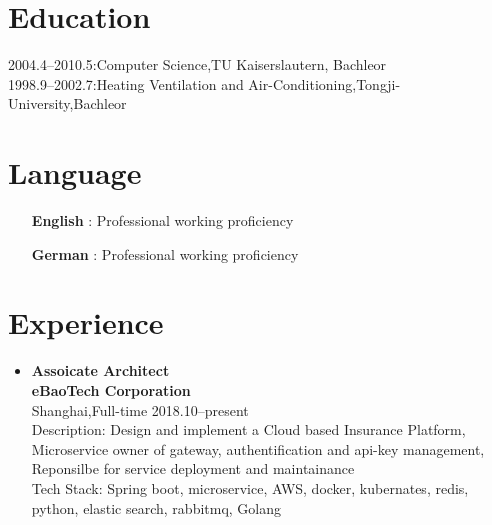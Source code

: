 \documentclass[a4paper,11pt]{res}
\begin{document}
 

\address{\bf  Permanent Address\\Donglu Lu 1350 Nong 21 Hao 501 Shi\\201206 Shanghai\\0086-18101890138\\klose911@googlemail.com}

\begin{resume}

  \section{Education}          
  2004.4--2010.5:\hfill Computer Science,TU Kaiserslautern, Bachleor\\
  1998.9--2002.7:\hfill Heating Ventilation and Air-Conditioning,Tongji-University,Bachleor

  \section{Language}
  \begin{itemize}
  \item[{\bf English}]: \hfill Professional working proficiency
  \item[{\bf German}]: \hfill Professional working proficiency
  \end{itemize}

  \section{Experience}
  \begin{itemize}
  \item{\bf Assoicate Architect}\\ {\bf eBaoTech Corporation}\\ Shanghai,Full-time \hfill 2018.10--present\\
    
    Description: Design and implement a Cloud based Insurance Platform,
    Microservice owner of gateway, authentification and api-key management,
    Reponsilbe for service deployment and maintainance \\
    
    Tech Stack:  Spring boot, microservice, AWS, docker, kubernates, redis, python, elastic search, rabbitmq, Golang \\
    

\end{itemize}
\end{resume}
\end{document}
